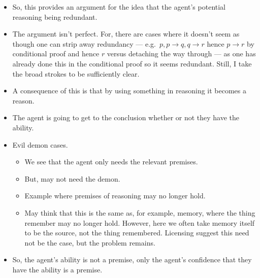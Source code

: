 \documentclass[10pt]{article}
\begin{document}
\begin{note}[Structure]
\begin{itemize}
\begin{itemize}
    \end{itemize}
  \item So, this provides an argument for the idea that the agent's potential reasoning being redundant.
  \item The argument isn't perfect.
    For, there are cases where it doesn't seem as though one can strip away redundancy --- e.g.\ \(p, p \rightarrow q, q \rightarrow r\) hence \(p \rightarrow r\) by conditional proof and hence \(r\) versus detaching the way through --- as one has already done this in the conditional proof so it seems redundant.
    Still, I take the broad strokes to be sufficiently clear.
  \item A consequence of this is that by using something in reasoning it becomes a reason.
  \item The agent is going to get to the conclusion whether or not they have the ability.
  \item Evil demon cases.
    \begin{itemize}
    \item We see that the agent only needs the relevant premises.
    \item But, may not need the demon.
    \item Example where premises of reasoning may no longer hold.
    \item May think that this is the same as, for example, memory, where the thing remember may no longer hold.
      However, here we often take memory itself to be the source, not the thing remembered.
      Licensing suggest this need not be the case, but the problem remains.
    \end{itemize}
  \item So, the agent's ability is not a premise, only the agent's confidence that they have the ability is a premise.
  \end{itemize}
\end{note}
\end{document}
